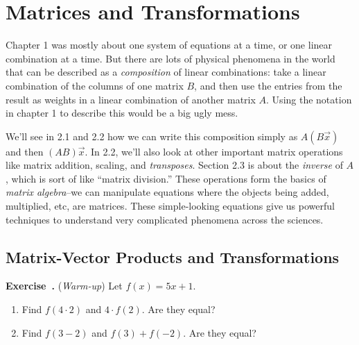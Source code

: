 \documentclass[11pt, letterpaper]{report}
\newenvironment{notes}{}{}
\newcounter{exercise}[section]
\newcommand{\exercise}{\refstepcounter{exercise}\par%
\noindent\textbf{Exercise~\theexercise.} }
\begin{document}

\chapter{Matrices and Transformations}
\label{chap:matrices-and-transformations}


Chapter 1 was mostly about one system of equations at a time, or one linear combination at a time. But there are lots of physical phenomena in the world that can be described as a \emph{composition} of linear combinations: take a linear combination of the columns of one matrix $B$, and then use the entries from the result as weights in a linear combination of another matrix $A$. Using the notation in chapter 1 to describe this would be a big ugly mess.

We'll see in 2.1 and 2.2 how we can write this composition simply as $A(B\vec{x})$ and then $(AB)\vec{x}$. In 2.2, we'll also look at other important matrix operations like matrix addition, scaling, and \emph{transposes}. Section 2.3 is about the \emph{inverse} of $A$, which is sort of like ``matrix division.'' These operations form the basics of \emph{matrix algebra}--we can manipulate equations where the objects being added, multiplied, etc, are matrices. These simple-looking equations give us powerful techniques to understand very complicated phenomena across the sciences.

\section{Matrix-Vector Products and Transformations}
\label{sec:matrix-vector-products}

\exercise (\emph{Warm-up}) \label{exercise:2.1wu1} Let $f(x) = 5x+1$.
\begin{enumerate}[label=(\alph*)]
\item Find $f(4\cdot 2)$ and $4\cdot f(2)$. Are they equal?
\begin{notes}
\vspace{5em}
\end{notes}

\item Find $f(3 - 2)$ and $f(3) + f(-2)$. Are they equal?
\end{enumerate}

\begin{notes}
\vspace{6em}
\end{notes}
\end{document}
